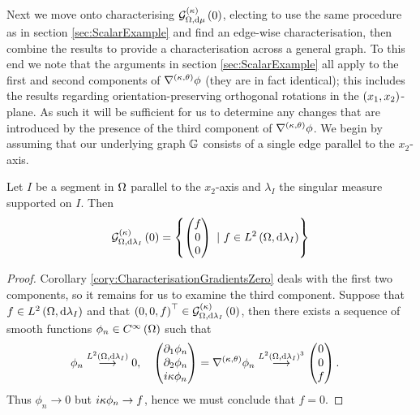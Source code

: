 Next we move onto characterising $\mathcal{G}_{ \Omega, \mathrm{d}\mu}^{(\kappa)}\left( 0 \right)$, electing to use the same procedure as in section \ref{sec:ScalarExample} and find an edge-wise characterisation, then combine the results to provide a characterisation across a general graph.
To this end we note that the arguments in section \ref{sec:ScalarExample} all apply to the first and second components of $\nabla^{\left( \kappa, \theta \right)}\phi$ (they are in fact identical); this includes the results regarding orientation-preserving orthogonal rotations in the $\left( x_1,x_2 \right)$-plane.
As such it will be sufficient for us to determine any changes that are introduced by the presence of the third component of $\nabla^{\left( \kappa, \theta \right)}\phi$.
We begin by assuming that our underlying graph $\mathbb{G}$ consists of a single edge parallel to the $x_2$-axis.
\begin{prop} \label{prop:kGradZeroParallel}
	Let $I$ be a segment in $\Omega$ parallel to the $x_2$-axis and $\lambda_I$ the singular measure supported on $I$.
	Then
	\begin{align*}
		\kgradZero{\ddom}{\lambda_I} = \clbracs{ 
		\begin{pmatrix} f \\ 0 \\ 0	\end{pmatrix} \ \vert \ f\in\ltwo{\ddom}{\lambda_I}
		}
	\end{align*}
\end{prop}
\begin{proof}
	Corollary \ref{cory:CharacterisationGradientsZero} deals with the first two components, so it remains for us to examine the third component.
	Suppose that $f\in L^{2}\left( \Omega,\mathrm{d}\lambda_I \right)$ and that $\left( 0,0,f \right)^\top\in\mathcal{G}_{ \Omega, \mathrm{d}\lambda_I}^{(\kappa)}\left( 0 \right)$, then there exists a sequence of smooth functions $\phi_n\in C^{\infty}\left( \Omega \right)$ such that
	\begin{align*}
		\phi_n \overset{L^{2}\left( \Omega,\mathrm{d}\lambda_I \right)}{\longrightarrow} 0, &\quad \begin{pmatrix} \partial_1\phi_n \\ \partial_2\phi_n \\ i\kappa\phi_n \end{pmatrix} = \nabla^{\left( \kappa, \theta \right)}\phi_n \overset{L^{2}\left( \Omega,\mathrm{d}\lambda_I \right)^3}{\longrightarrow} \begin{pmatrix} 0 \\ 0 \\ f	\end{pmatrix}.
	\end{align*}
	Thus $\phi_n\rightarrow0$ but $i\kappa\phi_n\rightarrow f$, hence we must conclude that $f=0$.
\end{proof}


